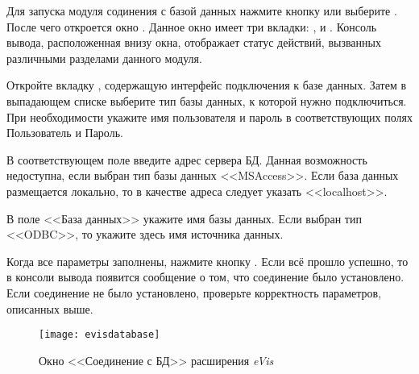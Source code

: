 \label{evis_launch_database}

Для запуска модуля содинения с базой данных нажмите кнопку
 или выберите  \arrow
{} \arrow {}.
После чего откроется окно . Данное окно имеет
три вкладки: ,  и
. Консоль вывода, расположенная внизу окна, отображает
статус действий, вызванных различными разделами данного модуля.

\label{evis_connect_database}

Откройте вкладку , содержащую интерфейс подключения
к базе данных. Затем в выпадающем списке 
выберите тип базы данных, к которой нужно подключиться. При необходимости
укажите имя пользователя и пароль в соответствующих полях Пользователь и
Пароль.

В соответствующем поле введите адрес сервера БД. Данная возможность
недоступна, если выбран тип базы данных <<MSAccess>>. Если база данных
размещается локально, то в качестве адреса следует указать <<localhost>>.

В поле <<База данных>> укажите имя базы данных. Если выбран тип <<ODBC>>, то
укажите здесь имя источника данных.

Когда все параметры заполнены, нажмите кнопку . Если всё
прошло успешно, то в консоли вывода появится сообщение о том, что соединение
было установлено. Если соединение не было установлено, проверьте корректность
параметров, описанных выше.

\begin{figure}[ht]
   \centering
   \texttt{[image: evisdatabase]}
   \caption{Окно <<Соединение с БД>> расширения \emph{eVis} \wincaption}\label{evisdatabase}
\end{figure}

